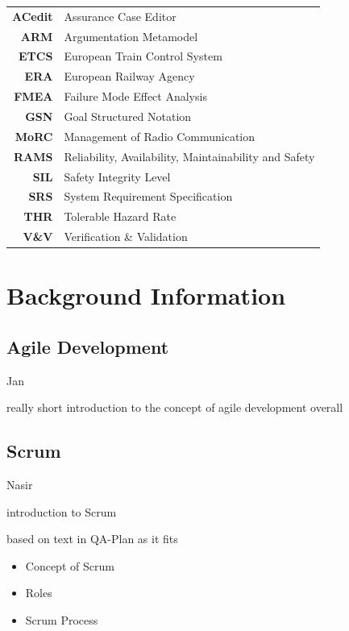 \documentclass{template/openetcs_report}
\begin{document}
\begin{tabular}{rl}
\textbf{ACedit} & Assurance Case Editor \\ 
\textbf{ARM} & Argumentation  Metamodel \\ 
\textbf{ETCS} & European Train Control System \\ \textbf{ERA} & European Railway Agency \\ \textbf{FMEA} & Failure Mode Effect Analysis \\ 
\textbf{GSN} & Goal Structured Notation \\ 
\textbf{MoRC} & Management of Radio Communication \\ 
\textbf{RAMS} & Reliability, Availability, Maintainability and Safety \\
\textbf{SIL} & Safety Integrity Level \\ 
\textbf{SRS} & System Requirement Specification \\ 
\textbf{THR} & Tolerable Hazard Rate \\ 
\textbf{V\&V} & Verification \& Validation \\ 
\end{tabular} 




\section{Background Information}
\label{sec:Background}


\subsection{Agile Development}

Jan

really short introduction to the concept of agile development overall

\subsection{Scrum}

Nasir

introduction to Scrum 

based on text in QA-Plan as it fits
\begin{itemize}
\item Concept of Scrum
\item Roles
\item Scrum Process
\end{itemize}
\end{document}
